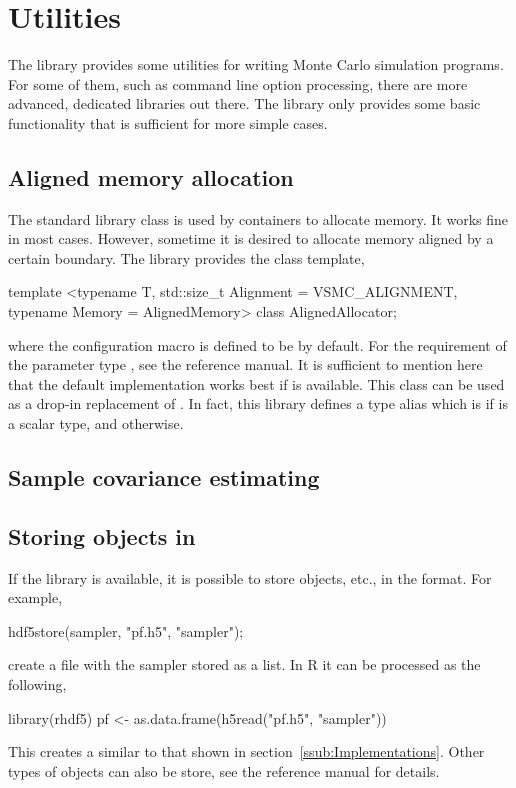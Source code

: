 \section{Utilities}
\label{sec:Utilities}

The library provides some utilities for writing Monte Carlo simulation
programs. For some of them, such as command line option processing, there are
more advanced, dedicated libraries out there. The library only provides some
basic functionality that is sufficient for more simple cases.

\subsection{Aligned memory allocation}
\label{sub:Aligned memory allocation}

The standard library class  is used by containers to
allocate memory. It works fine in most cases. However, sometime it is desired
to allocate memory aligned by a certain boundary. The library provides the
class template,
\begin{cppcode}
  template <typename T, std::size_t Alignment = VSMC_ALIGNMENT,
  typename Memory = AlignedMemory>
  class AlignedAllocator;
\end{cppcode}
where the configuration macro  is defined to be
 by default. For the requirement of the parameter type
, see the reference manual. It is sufficient to mention here
that the default implementation works best if \tbb is available. This class can
be used as a drop-in replacement of . In fact,
this library defines a type alias  which is
 if  is a scalar
type, and  otherwise.

\subsection{Sample covariance estimating}
\label{sub:Sample covariance estimating}

\subsection{Storing objects in \protect\hdf}
\label{sub:Storing objects in hdf}

If the \hdf library is available, it is possible to store
 objects, etc., in the \hdf format. For example,
\begin{cppcode}
  hdf5store(sampler, "pf.h5", "sampler");
\end{cppcode}
create a \hdf file with the sampler stored as a list. In R it can be processed
as the following,
\begin{rcode}
  library(rhdf5)
  pf <- as.data.frame(h5read("pf.h5", "sampler"))
\end{rcode}
This creates a  similar to that shown in
section~\ref{ssub:Implementations}. Other types of objects can also be store,
see the reference manual for details.

